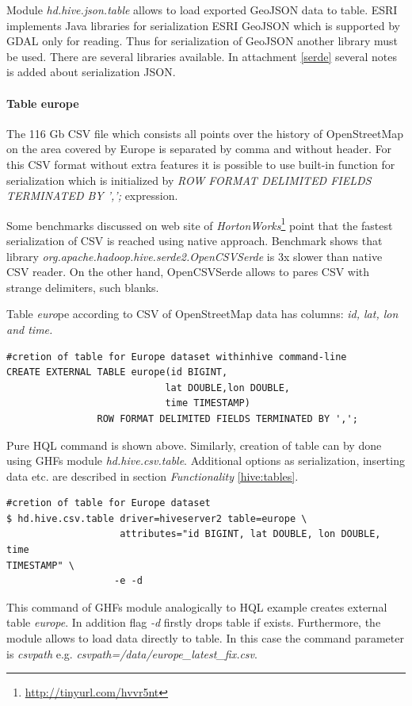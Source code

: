 \documentclass[a4paper,12pt,oneside]{report}
\begin{document}
	
		Module \textit{hd.hive.json.table} allows to load exported GeoJSON data to
	table. ESRI implements Java libraries for serialization ESRI GeoJSON which is
	supported by GDAL only for reading. Thus for serialization of GeoJSON another library must be
	used. There are several libraries available. In attachment \ref{serde} several notes is added about serialization
	JSON.

\paragraph{Table europe}
		The 116 Gb CSV file which consists all points over the history of OpenStreetMap on the area covered by Europe is separated by comma and without header. For this CSV
	format without extra features it is possible to use built-in function for
	serialization which is initialized by \textit{ROW FORMAT DELIMITED FIELDS
	TERMINATED BY ',';} expression.
		
	Some benchmarks discussed on web site of
	\textit{HortonWorks}\footnote{\url{http://tinyurl.com/hvvr5nt}} point that the fastest serialization of CSV is reached using native approach. Benchmark shows
	that library \textit{org.apache.hadoop.hive.serde2.OpenCSVSerde} is 3x slower
	than native CSV reader. On the other hand, OpenCSVSerde allows to pares CSV with
	strange delimiters, such blanks.
		
		
	Table \textit{euro}pe according to CSV of OpenStreetMap data has columns: \textit{id, lat, lon
and time.}
\begin{footnotesize}
	\begin{lstlisting}[style=python]
#cretion of table for Europe dataset withinhive command-line
CREATE EXTERNAL TABLE europe(id BIGINT,
                            lat DOUBLE,lon DOUBLE,
                            time TIMESTAMP)
			    ROW FORMAT DELIMITED FIELDS TERMINATED BY ',';
		\end{lstlisting}
	\end{footnotesize}
	Pure HQL command is shown above. Similarly, creation of table can by done using GHFs
	module \textit{hd.hive.csv.table}. Additional options as serialization,
	inserting data etc. are described in section
	\textit{Functionality} \ref{hive:tables}. 
\begin{footnotesize}
	\begin{lstlisting}[style=python]
#cretion of table for Europe dataset
$ hd.hive.csv.table driver=hiveserver2 table=europe \
                    attributes="id BIGINT, lat DOUBLE, lon DOUBLE, time
TIMESTAMP" \
                   -e -d
		\end{lstlisting}
	\end{footnotesize}
	This command of GHFs module analogically to HQL example creates external table
	\textit{europe}. In addition flag \textit{-d} firstly drops table if exists.
	Furthermore, the module allows to load data directly to table. In this case the
	command parameter is \textit{csvpath} e.g. \newline
	\textit{csvpath=/data/europe\_latest\_fix.csv}.
	
\end{document}
